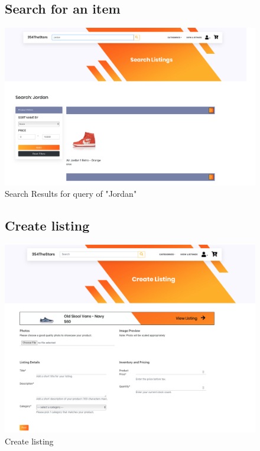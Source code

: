 \documentclass[11pt]{article}
\begin{document}
\begin{figure}[ht!]
    \subsection{Search for an item}
    \centering
    \includegraphics[width=\textwidth,height=0.3\paperheight,keepaspectratio]{Diagrams/External_Interfaces/Search_Listing.png}
    \caption{Search Results for query of "Jordan"}
    \label{fig: Search For An Item}
\end{figure}
\FloatBarrier

\begin{figure}[ht!]
    \subsection{Create listing}
    \centering
    \includegraphics[width=\textwidth,height=0.3\paperheight,keepaspectratio]{Diagrams/External_Interfaces/Create_Listing.png}
    \caption{Create listing}
    \label{fig: Latest listings}
\end{figure}
\FloatBarrier
\end{document}
